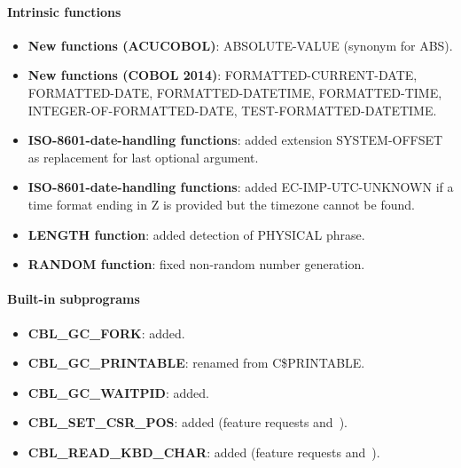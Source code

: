 \paragraph{Intrinsic functions}
\begin{itemize}
\item \textbf{New functions (ACUCOBOL)}: ABSOLUTE-VALUE (synonym for ABS).
\item \textbf{New functions (COBOL 2014)}: FORMATTED-CURRENT-DATE, FORMATTED-DATE, FORMATTED-DATETIME, FORMATTED-TIME, INTEGER-OF-FORMATTED-DATE, TEST-FORMATTED-DATETIME.
\item \textbf{ISO-8601-date-handling functions}: added extension SYSTEM-OFFSET as replacement for last optional argument.
\item \textbf{ISO-8601-date-handling functions}: added EC-IMP-UTC-UNKNOWN if a time format ending in Z is provided but the timezone cannot be found.
\item \textbf{LENGTH function}: added detection of PHYSICAL phrase.
\item \textbf{RANDOM function}: fixed non-random number generation.
\end{itemize}

\paragraph{Built-in subprograms}
\begin{itemize}
\item \textbf{CBL\_GC\_FORK}: added.
\item \textbf{CBL\_GC\_PRINTABLE}: renamed from C\$PRINTABLE.
\item \textbf{CBL\_GC\_WAITPID}: added.
\item \textbf{CBL\_SET\_CSR\_POS}: added (feature requests  and~).
\item \textbf{CBL\_READ\_KBD\_CHAR}: added (feature requests  and~).
\end{itemize}


